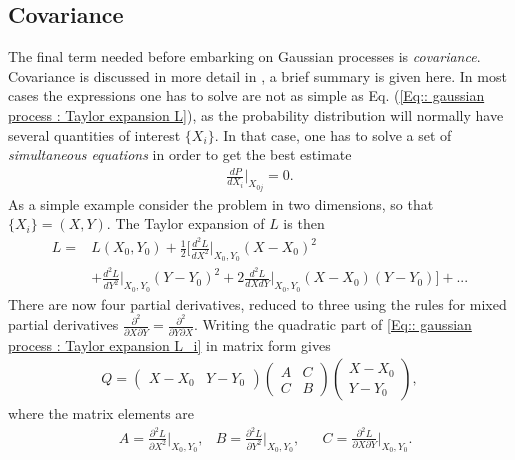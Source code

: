 \documentclass[twoside,english]{uiofysmaster}
\begin{document}
\subsection{Covariance}

The final term needed before embarking on Gaussian processes is \textit{covariance}. Covariance is discussed in more detail in \cite{sivia2006data}, a brief summary is given here. In most cases the expressions one has to solve are not as simple as Eq. (\ref{Eq:: gaussian process : Taylor expansion L}), as the probability distribution will normally have several quantities of interest $\{ X_i \}$. In that case, one has to solve a set of \textit{simultaneous equations} in order to get the best estimate
\begin{align}\label{Eq:: gaussian process : Best estimate X_i}
\frac{dP}{dX_i} \Big|_{X_{0j}} =0.
\end{align}
As a simple example consider the problem in two dimensions, so that $\{ X_i \} = (X, Y)$. The Taylor expansion of $L$ is then
\begin{align}\label{Eq:: gaussian process : Taylor expansion L_i}
L =& L(X_0, Y_0) + \frac{1}{2} \Big[ \frac{d^2L}{dX^2}  \Big|_{X_0, Y_0}(X-X_0)^2 \nonumber \\
& + \frac{d^2L}{dY^2}  \Big|_{X_0, Y_0}(Y-Y_0)^2 + 2 \frac{d^2L}{dXdY}  \Big|_{X_0, Y_0}(X-X_0)(Y-Y_0) \Big] +...
\end{align}
There are now four partial derivatives, reduced to three using the rules for mixed partial derivatives $\frac{\partial^2}{\partial X \partial Y} = \frac{\partial^2}{\partial Y \partial X}$. Writing the quadratic part of \ref{Eq:: gaussian process : Taylor expansion L_i} in matrix form gives
\begin{align}
Q = 
\begin{pmatrix}
X-X_0 & Y -Y_0
\end{pmatrix}
\begin{pmatrix}
A & C\\
C & B
\end{pmatrix}
\begin{pmatrix}
X -X_0\\
Y-Y_0
\end{pmatrix},
\end{align}
where the matrix elements are
\begin{align}
&A = \frac{\partial^2 L}{\partial X^2} \Big|_{X_0, Y_0}, &B = \frac{\partial^2 L}{\partial Y^2} \Big|_{X_0, Y_0}, &&C = \frac{\partial^2 L}{\partial X \partial Y} \Big|_{X_0, Y_0}.
\end{align}
\end{document}
